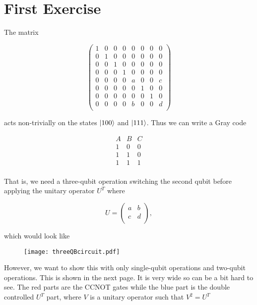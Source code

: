 \section{First Exercise}
The matrix
\begin{singlespace} 
\begin{equation}
    \begin{pmatrix}
        1 & 0 & 0 & 0 & 0 & 0 & 0 & 0\\
        0 & 1 & 0 & 0 & 0 & 0 & 0 & 0\\
        0 & 0 & 1 & 0 & 0 & 0 & 0 & 0\\
        0 & 0 & 0 & 1 & 0 & 0 & 0 & 0\\
        0 & 0 & 0 & 0 & a & 0 & 0 & c\\
        0 & 0 & 0 & 0 & 0 & 1 & 0 & 0\\
        0 & 0 & 0 & 0 & 0 & 0 & 1 & 0\\
        0 & 0 & 0 & 0 & b & 0 & 0 & d\\
    \end{pmatrix}
\end{equation}
\end{singlespace}
acts non-trivially on the states $\ket{100}$ and $\ket{111}$. Thus we can write a Gray code
\begin{singlespace}
\begin{equation}
    \begin{matrix}
        A & B & C\\
        1 & 0 & 0\\
        1 & 1 & 0\\
        1 & 1 & 1\\
    \end{matrix}
\end{equation}
\end{singlespace}
That is, we need a three-qubit operation switching the second qubit before applying the unitary operator $U^T$ where 
\begin{singlespace}
\begin{equation}
    U = \begin{pmatrix}
        a & b\\
        c & d\\
    \end{pmatrix},
\end{equation}
\end{singlespace}
which would look like
\begin{figure}[H]
    \centering
    \texttt{[image: threeQBcircuit.pdf]}
\end{figure}
However, we want to show this with only single-qubit operations and two-qubit operations. This is shown in the next page. It is very wide so can be a bit hard to see. The red parts are the CCNOT gates while the blue part is the double controlled $U^T$ part, where $V$ is a unitary operator such that $V^2 = U^T$

